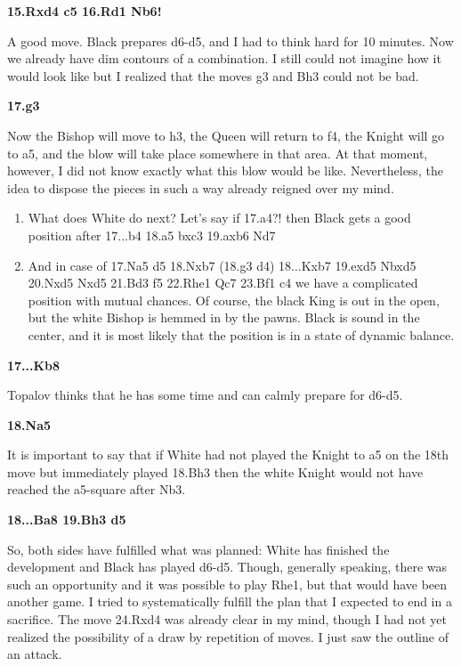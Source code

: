 \documentclass[
	11pt,twocolumn]{article}
\renewcommand{\bf}{\bfseries}
\begin{document}
{\bf 15.Rxd4 c5 16.Rd1 Nb6! }

A good move. Black prepares d6-d5, and I had to think hard for 10 minutes. Now we already have dim contours of a combination. I still could not imagine how it would look like but I realized that the moves g3 and Bh3 could not be bad.

{\bf 17.g3 }

Now the Bishop will move to h3, the Queen will return to f4, the Knight will go to a5, and the blow will take place somewhere in that area. At that moment, however, I did not know exactly what this blow would be like. Nevertheless, the idea to dispose the pieces in such a way already reigned over my mind.



\begin{enumerate}
\item
What does White do next? Let's say if 17.a4?!  then Black gets a good position after 17...b4 18.a5 bxc3 19.axb6 Nd7

\item
And in case of 17.Na5 d5 18.Nxb7 (18.g3 d4) 18...Kxb7 19.exd5 Nbxd5 20.Nxd5 Nxd5 21.Bd3 f5 22.Rhe1 Qc7 23.Bf1 c4 we have a complicated position with mutual chances. Of course, the black King is out in the open, but the white Bishop is hemmed in by the pawns. Black is sound in the center, and it is most likely that the position is in a state of dynamic balance. 
\end{enumerate}

{\bf 17...Kb8 }

Topalov thinks that he has some time and can calmly prepare for d6-d5.

{\bf 18.Na5 }

It is important to say that if White had not played the Knight to a5 on the 18th move but immediately played 18.Bh3 then the white Knight would not have reached the a5-square after Nb3. 

{\bf 18...Ba8 19.Bh3 d5 }

So, both sides have fulfilled what was planned: White has finished the development and Black has played d6-d5. Though, generally speaking, there was such an opportunity and it was possible to play Rhe1, but that would have been another game. I tried to systematically fulfill the plan that I expected to end in a sacrifice. The move 24.Rxd4 was already clear in my mind, though I had not yet realized the possibility of a draw by repetition of moves. I just saw the outline of an attack.
\end{document}

